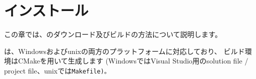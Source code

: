 \newpage
\section{インストール}
\label{sec:Install}
\parindent=0pt

この章では、\SprLib のダウンロード及びビルドの方法について説明します。

\medskip
\SprLib は、Windowsおよびunixの両方のプラットフォームに対応しており、
ビルド環境はCMakeを用いて生成します
(WindowsではVisual Studio用のsolution file / project file、unixでは\tt{Makefile})。


